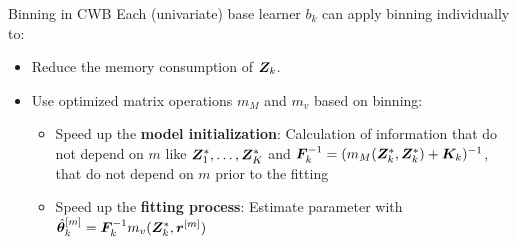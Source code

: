 \documentclass[t,10pt]{beamer}
\newcommand{\penMat}{\bm{K}}
\begin{document}
\begin{frame}{Binning in CWB}
    Each (univariate) base learner $b_k$ can apply binning individually to:
    \begin{itemize}
        \item 
            Reduce the memory consumption of $\bm{Z}_k$.%
        
        \item
            Use optimized matrix operations $m_M$ and $m_v$ based on binning:
            \begin{itemize}
                \item 
                    Speed up the \textbf{model initialization}: Calculation of information that do not depend on $m$ like $\bm{Z}^\ast_1, \dots, \bm{Z}^\ast_K$ and $\bm{F}_k^{-1} = (m_M(\design_k^{\ast}, \design_k^\ast) + \penMat_k)^{-1}$, that do not depend on $m$ prior to the fitting
                \item 
                    Speed up the \textbf{fitting process}: Estimate parameter with $\hat{\bm{\theta}}^{[m]}_k = \bm{F}_k^{-1} m_v(\bm{Z}_k^\ast, \bm{r}^{[m]})$ 
            \end{itemize}
      
%      
  \end{itemize}
\end{frame}
\end{document}
